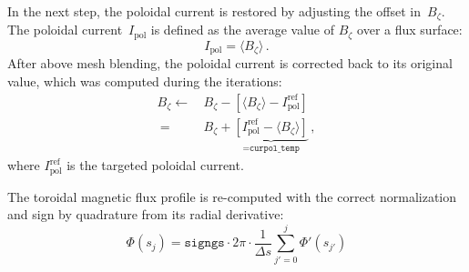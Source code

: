 In the next step, the poloidal current is restored by adjusting the offset in~$B_\zeta$.
The poloidal current~$I_\textrm{pol}$ is defined as the average value of $B_\zeta$ over a flux surface:
\begin{equation}
 I_\textrm{pol} = \langle B_\zeta \rangle \, .
\end{equation}
After above mesh blending, the poloidal current is corrected back to its original value,
which was computed during the iterations:
\begin{align}
 B_\zeta \leftarrow&\, B_\zeta - \left[ \langle B_\zeta \rangle - I_\textrm{pol}^\textrm{ref} \right] \nonumber \\
     ~            =&\, B_\zeta + \underbrace{\left[ I_\textrm{pol}^\textrm{ref} - \langle B_\zeta \rangle \right]}_{=\texttt{curpol\_temp}} \, ,
\end{align}
where $I_\textrm{pol}^\textrm{ref}$ is the targeted poloidal current.

The toroidal magnetic flux profile is re-computed with the correct normalization and sign
by quadrature from its radial derivative:
\begin{equation}
 \Phi(s_j) = \texttt{signgs} \cdot 2 \pi \cdot \frac{1}{\Delta s} \sum\limits_{j'=0}^{j} \Phi'(s_{j'})
\end{equation}

